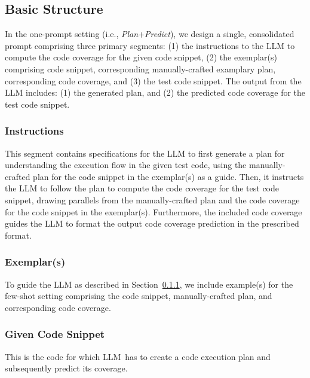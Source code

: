 
\subsection{Basic Structure}
In the one-prompt setting (i.e., \textit{Plan}+\textit{Predict}), we design a single, consolidated prompt comprising three primary segments: (1) the instructions to the LLM to compute the code coverage for the given code snippet, (2) the exemplar(s) comprising code snippet, corresponding manually-crafted examplary plan, corresponding code coverage, and (3) the test code snippet. The output from the LLM includes: (1) the generated plan, and (2) the predicted code coverage for the test code snippet.

\subsubsection{Instructions}\label{sec:one-prompt-instructions} This segment contains specifications for the LLM to first generate a plan for understanding the execution flow in the given test code, using the manually-crafted plan for the code snippet in the exemplar(s) as a guide. Then, it instructs the LLM to follow the plan to compute the code coverage for the test code snippet, drawing parallels from the manually-crafted plan and the code coverage for the code snippet in the exemplar(s). Furthermore, the included code coverage guides the LLM to format the output code coverage prediction in the prescribed format.

\subsubsection{Exemplar(s)}\label{sec:one-prompt-structure} To guide the LLM as described in Section~\ref{sec:one-prompt-instructions}, we include example(s) for the few-shot setting comprising the code snippet, manually-crafted plan, and corresponding code coverage.

\subsubsection{Given Code Snippet} This is the code for which LLM~has to create a code execution plan and subsequently predict its coverage.

